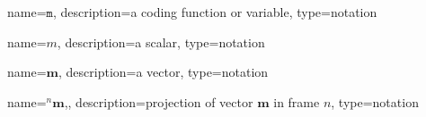 

	\newcommand{\code}[1]{\ensuremath{\texttt{#1}}}
	{%
		name=\code{m},
		description=a coding function or variable,
		type=notation
	}

	\newcommand{\der}{\ensuremath{\mathrm{d}}}

	{%
		name=\ensuremath{m},
		description=a scalar,
		type=notation
	}

	\renewcommand{\vec}[1]{\ensuremath{\boldsymbol{#1}}}
	{%
		name=\vec{m},
		description=a vector,
		type=notation
	}

	\newcommand{\project}[2]{\ensuremath{{}^{#2}\!{#1}}}
	{%
		name=\project{\vec{m}}{n},,
		description=projection of vector \vec{m} in frame $n$,
		type=notation
	}

